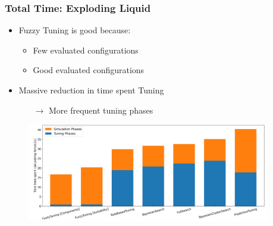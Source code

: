 \documentclass[
	10pt,
	t		%
]{beamer}
\begin{document}
\begin{frame}
	\frametitle{Total Time: Exploding Liquid}
	\begin{itemize}
		\item Fuzzy Tuning is good because:
		      \begin{itemize}
			      \item Few evaluated configurations
			      \item Good evaluated configurations
		      \end{itemize}
		\item Massive reduction in time spent Tuning
		      \begin{itemize}
			      \item[$\rightarrow$] More frequent tuning phases
		      \end{itemize}
	\end{itemize}
	
	\begin{figure}
		\centering
		\includegraphics[width=0.95\textwidth]{figures/exploding-liquid-total.png}
	\end{figure}
\end{frame}
\end{document}
